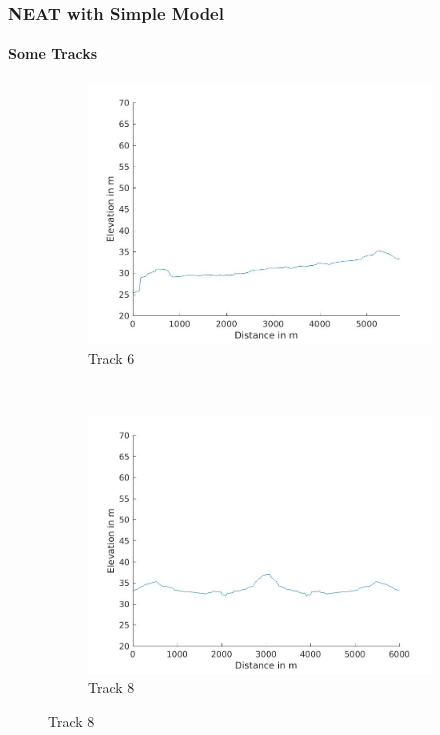 \documentclass[8pt]{beamer}
\begin{document}
\begin{frame}
	\frametitle{NEAT with Simple Model}
	\framesubtitle{Some Tracks}
	\begin{figure}
    \centering
    \begin{subfigure}[b]{0.3\textwidth}
        \includegraphics[width=\textwidth]{images/t6.jpg}
        \caption{Track 6}
        \label{fig:gull}
    \end{subfigure}
    ~ %
    \begin{subfigure}[b]{0.3\textwidth}
        \includegraphics[width=\textwidth]{images/t8.jpg}
        \caption{Track 8}

\end{subfigure}
\end{figure}
\end{frame}
\end{document}
